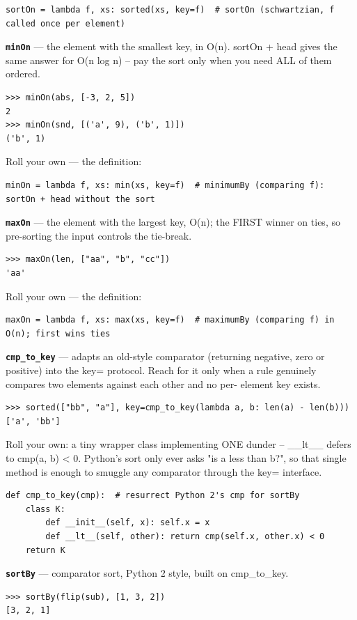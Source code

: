 \documentclass[10pt,letterpaper]{article}
\begin{document}
\begin{lstlisting}[style=ex]
sortOn = lambda f, xs: sorted(xs, key=f)  # sortOn (schwartzian, f called once per element)
\end{lstlisting}
\textbf{\texttt{minOn}} --- the element with the smallest key, in O(n). sortOn + head gives the same answer for O(n log n) -- pay the sort only when you need ALL of them ordered.
\begin{lstlisting}[style=ex]
>>> minOn(abs, [-3, 2, 5])
2
>>> minOn(snd, [('a', 9), ('b', 1)])
('b', 1)
\end{lstlisting}

Roll your own --- the definition:

\begin{lstlisting}[style=ex]
minOn = lambda f, xs: min(xs, key=f)  # minimumBy (comparing f): sortOn + head without the sort
\end{lstlisting}
\textbf{\texttt{maxOn}} --- the element with the largest key, O(n); the FIRST winner on ties, so pre-sorting the input controls the tie-break.
\begin{lstlisting}[style=ex]
>>> maxOn(len, ["aa", "b", "cc"])
'aa'
\end{lstlisting}

Roll your own --- the definition:

\begin{lstlisting}[style=ex]
maxOn = lambda f, xs: max(xs, key=f)  # maximumBy (comparing f) in O(n); first wins ties
\end{lstlisting}
\textbf{\texttt{cmp\_to\_key}} --- adapts an old-style comparator (returning negative, zero or positive) into the key= protocol. Reach for it only when a rule genuinely compares two elements against each other and no per- element key exists.
\begin{lstlisting}[style=ex]
>>> sorted(["bb", "a"], key=cmp_to_key(lambda a, b: len(a) - len(b)))
['a', 'bb']
\end{lstlisting}

Roll your own: a tiny wrapper class implementing ONE dunder -- \_\_lt\_\_ defers to cmp(a, b) < 0. Python's sort only ever asks "is a less than b?", so that single method is enough to smuggle any comparator through the key= interface.

\begin{lstlisting}[style=ex]
def cmp_to_key(cmp):  # resurrect Python 2's cmp for sortBy
    class K:
        def __init__(self, x): self.x = x
        def __lt__(self, other): return cmp(self.x, other.x) < 0
    return K
\end{lstlisting}
\textbf{\texttt{sortBy}} --- comparator sort, Python 2 style, built on cmp\_to\_key.
\begin{lstlisting}[style=ex]
>>> sortBy(flip(sub), [1, 3, 2])
[3, 2, 1]
\end{lstlisting}
\end{document}
